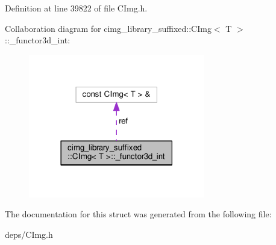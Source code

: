Definition at line 39822 of file C\+Img.\+h.



Collaboration diagram for cimg\+\_\+library\+\_\+suffixed\+:\+:C\+Img$<$ T $>$\+:\+:\+\_\+functor3d\+\_\+int\+:
\nopagebreak
\begin{figure}[H]
\begin{center}
\leavevmode
\includegraphics[width=218pt]{d3/d00/structcimg__library__suffixed_1_1CImg_1_1__functor3d__int__coll__graph}
\end{center}
\end{figure}


The documentation for this struct was generated from the following file\+:\begin{DoxyCompactItemize}
\item 
deps/C\+Img.\+h\end{DoxyCompactItemize}
